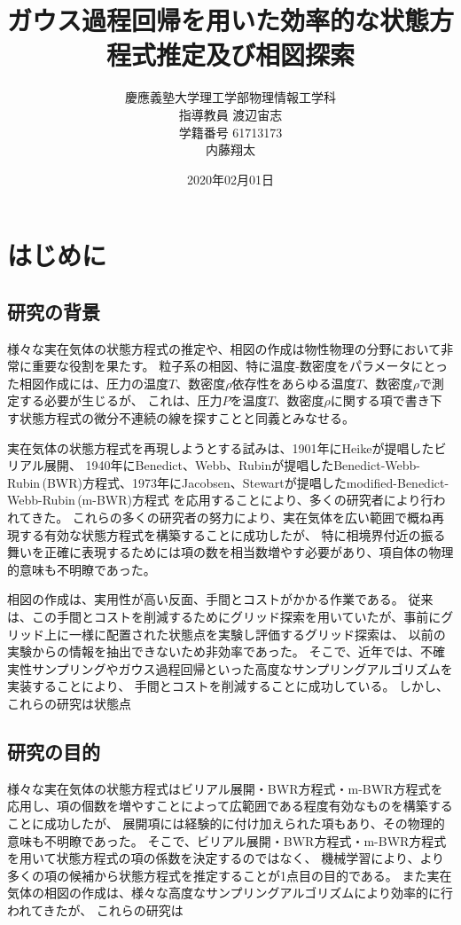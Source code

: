 \documentclass[titlepage]{jsreport}
\title{ガウス過程回帰を用いた効率的な状態方程式推定及び相図探索}
\author{慶應義塾大学理工学部物理情報工学科\\
指導教員 渡辺宙志\\
学籍番号 61713173\\
内藤翔太}
\date{2020年02月01日}
\begin{document}
\maketitle

\tableofcontents

\chapter{はじめに} \label{chap:introduction}

\section{研究の背景} \label{intro-background}
様々な実在気体の状態方程式の推定や、相図の作成は物性物理の分野において非常に重要な役割を果たす。
粒子系の相図、特に温度-数密度をパラメータにとった相図作成には、圧力の温度$T$、数密度$\rho$依存性をあらゆる温度$T$、数密度$\rho$で測定する必要が生じるが、
これは、圧力$P$を温度$T$、数密度$\rho$に関する項で書き下す状態方程式の微分不連続の線を探すことと同義とみなせる。

実在気体の状態方程式を再現しようとする試みは、1901年にHeikeが提唱したビリアル展開\cite{virial-Heike}、
1940年にBenedict、Webb、Rubinが提唱したBenedict-Webb-Rubin\,(BWR)方程式\cite{BWR-equation:original}、1973年にJacobsen、Stewartが提唱したmodified-Benedict-Webb-Rubin\,(m-BWR)方程式\cite{m-BWR-equation}
を応用することにより、多くの研究者により行われてきた\cite{MCCARTY1974276,BWR-equation:13,BWR-equation:25}。
これらの多くの研究者の努力により、実在気体を広い範囲で概ね再現する有効な状態方程式を構築することに成功したが、
特に相境界付近の振る舞いを正確に表現するためには項の数を相当数増やす必要があり、項自体の物理的意味も不明瞭であった。

相図の作成は、実用性が高い反面、手間とコストがかかる作業である。
従来は、この手間とコストを削減するためにグリッド探索\cite{grid1,grid2}を用いていたが、事前にグリッド上に一様に配置された状態点を実験し評価するグリッド探索は、
以前の実験からの情報を抽出できないため非効率であった。
そこで、近年では、不確実性サンプリング\cite{uncertainty-sampling1,uncertainty-sampling2}やガウス過程回帰\cite{gaussian-phase}といった高度なサンプリングアルゴリズムを実装することにより、
手間とコストを削減することに成功している。
しかし、これらの研究は状態点


\section{研究の目的} \label{intro-purpose}
様々な実在気体の状態方程式はビリアル展開・BWR方程式・m-BWR方程式を応用し、項の個数を増やすことによって広範囲である程度有効なものを構築することに成功したが、
展開項には経験的に付け加えられた項もあり、その物理的意味も不明瞭であった。
そこで、ビリアル展開・BWR方程式・m-BWR方程式を用いて状態方程式の項の係数を決定するのではなく、
機械学習により、より多くの項の候補から状態方程式を推定することが1点目の目的である。
また実在気体の相図の作成は、様々な高度なサンプリングアルゴリズムにより効率的に行われてきたが、
これらの研究は
\end{document}
